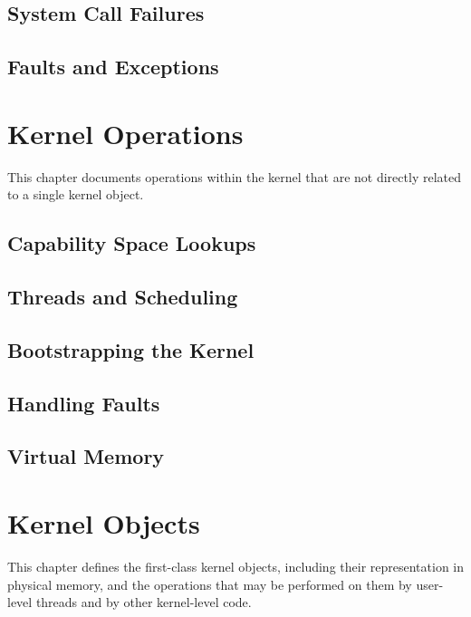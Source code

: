 \documentclass{ertos-book}
\begin{document}
\section[failures]{System Call Failures}


\section[faults]{Faults and Exceptions}


\chapter[kernel]{Kernel Operations}

This chapter documents operations within the kernel that are not directly related to a single kernel object.

\section[cspace]{Capability Space Lookups}


\section[thread]{Threads and Scheduling}


\section[init]{Bootstrapping the Kernel}


\section[faulthandler]{Handling Faults}


\section[vspace]{Virtual Memory}


\chapter[object]{Kernel Objects}

This chapter defines the first-class kernel objects, including their representation in physical memory, and the operations that may be performed on them by user-level threads and by other kernel-level code.
\end{document}
